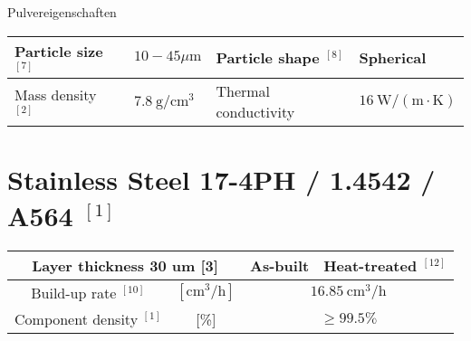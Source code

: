 \documentclass[10pt]{article}
\begin{document}
Pulvereigenschaften

\begin{center}
\begin{tabular}{|l|l|l|l|}
\hline
Particle size ${ }^{[7]}$ & $10-45 \mu \mathrm{m}$ & Particle shape ${ }^{[8]}$ & Spherical \\
\hline
Mass density ${ }^{[2]}$ & $7.8 \mathrm{~g} / \mathrm{cm}^{3}$ & Thermal conductivity & $16 \mathrm{~W} /(\mathrm{m} \cdot \mathrm{K})$ \\
\hline
\end{tabular}
\end{center}

\section*{Stainless Steel 17-4PH / 1.4542 / A564 ${ }^{[1]}$}
\begin{center}
\begin{tabular}{|c|c|c|c|}
\hline
\multicolumn{2}{|c|}{Layer thickness 30 um [3]} & As-built & Heat-treated ${ }^{[12]}$ \\
\hline
Build-up rate ${ }^{[10]}$ & $\left[\mathrm{cm}^{3} / \mathrm{h}\right]$ & \multicolumn{2}{|c|}{$16.85 \mathrm{~cm}^{3} / \mathrm{h}$} \\
\hline
Component density ${ }^{[1]}$ & [\%] & \multicolumn{2}{|c|}{$\geq 99.5 \%$} \\
\hline
\end{tabular}
\end{center}
\end{document}
